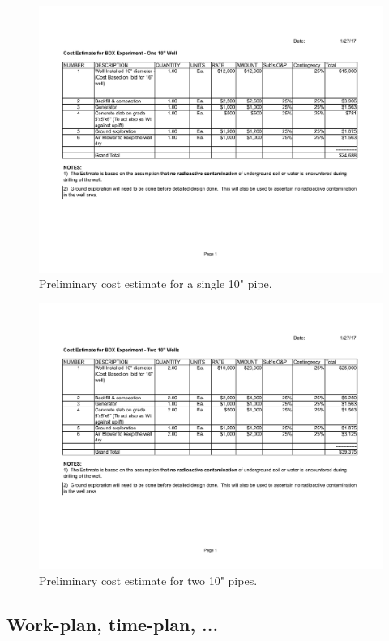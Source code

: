 \begin{figure}[thp] 
\center
\includegraphics[width=17cm,clip=true]{figs/Preliminary_Cost_Estimate_10_Inch_pipe.pdf}
\caption{Preliminary cost estimate for a single 10" pipe.}
\label{fig:Preliminary_Cost_Estimate_10_Inch_pipe}
\end{figure}

\begin{figure}[thp] 
\center
\includegraphics[width=17cm,clip=true]{figs/Preliminary_Cost_Estimate_for_two_10_Inch_pipes.pdf}
\caption{Preliminary cost estimate for two 10" pipes.}
\label{fig:Preliminary_Cost_Estimate_for_two_10_Inch_pipes}
\end{figure}


\subsection{Work-plan, time-plan, ...}